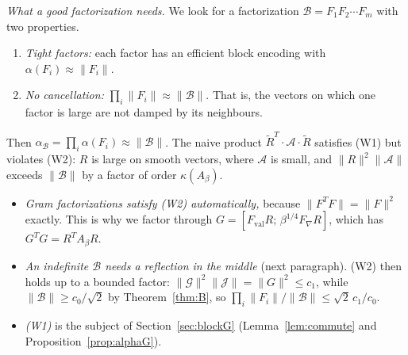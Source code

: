 \documentclass[11pt,a4paper]{article}
\newcommand{\A}{\mathcal{A}}
\newcommand{\B}{\mathcal{B}}
\newcommand{\G}{\mathcal{G}}
\newcommand{\J}{\mathcal{J}}
\newcommand{\Rt}{\widetilde R}
\theoremstyle{remark}
\begin{document}
\emph{What a good factorization needs.} We look for a factorization
$\B=F_1F_2\cdots F_m$ with two properties.
\begin{enumerate}
\item[(W1)] \emph{Tight factors:} each factor has an efficient block encoding
  with $\alpha(F_i)\approx\|F_i\|$.
\item[(W2)] \emph{No cancellation:} $\prod_i\|F_i\|\approx\|\B\|$. That is, the vectors on which
  one factor is large are not damped by its neighbours.
\end{enumerate}
Then $\alpha_\B=\prod_i\alpha(F_i)\approx\|\B\|$. The naive product $\Rt^T\cdot\A\cdot\Rt$ satisfies (W1)
but violates (W2): $R$ is large on smooth vectors, where $\A$ is small, and
$\|R\|^2\|\A\|$ exceeds $\|\B\|$ by a factor of order $\kappa(A_\beta)$.
\begin{itemize}
\item \emph{Gram factorizations satisfy (W2) automatically,} because
  $\|F^TF\|=\|F\|^2$ exactly. This is why we factor through
  $G=[F_{\mathrm{val}}R;\,\beta^{1/4}F_\nabla R]$, which has $G^TG=R^TA_\beta R$.
\item \emph{An indefinite $\B$ needs a reflection in the middle} (next
  paragraph). (W2) then holds up to a bounded factor: $\|\G\|^2\|\J\|=\|G\|^2\le c_1$,
  while $\|\B\|\ge c_0/\sqrt2$ by Theorem~\ref{thm:B}, so
  $\prod_i\|F_i\|/\|\B\|\le\sqrt2\,c_1/c_0$.
\item \emph{(W1)} is the subject of Section~\ref{sec:blockG}
  (Lemma~\ref{lem:commute} and Proposition~\ref{prop:alphaG}).
\end{itemize}
\end{document}

